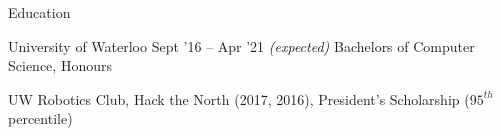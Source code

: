\documentclass{resume} %
\begin{document}

\begin{rSection}{Education}
  \begin{rSubsection}{University of Waterloo}
		     {Sept '16 -- Apr '21 \em (expected)}
		     {Bachelors of Computer Science, Honours}
		     {}
    \item UW Robotics Club, Hack the North (2017, 2016), President's Scholarship
      ($95^{th}$ percentile)
  \end{rSubsection}
\end{rSection} 
\end{document}
